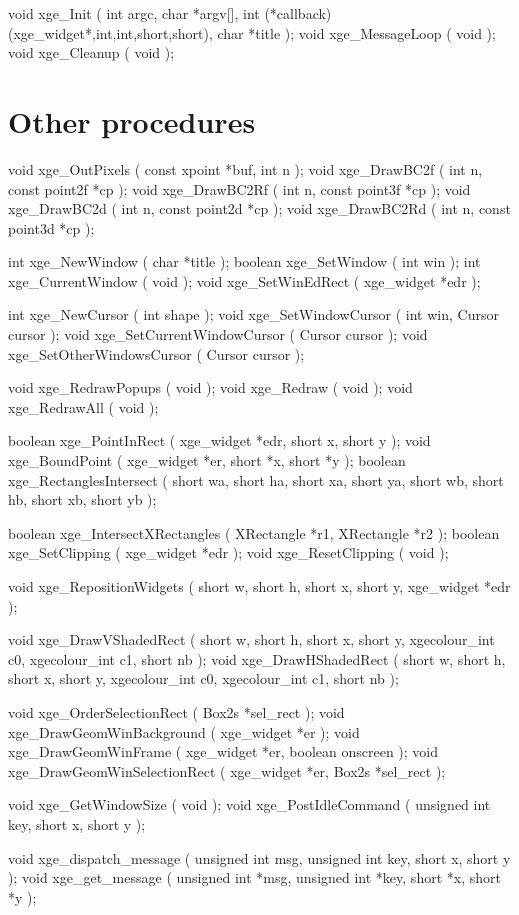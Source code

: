 \begin{listingC}
void xge_Init ( int argc, char *argv[],
                int (*callback)(xge_widget*,int,int,short,short),
                char *title );
void xge_MessageLoop ( void );
void xge_Cleanup ( void );
\end{listingC}


\section{Other procedures}

\begin{listingC}
void xge_OutPixels ( const xpoint *buf, int n );
void xge_DrawBC2f ( int n, const point2f *cp );
void xge_DrawBC2Rf ( int n, const point3f *cp );
void xge_DrawBC2d ( int n, const point2d *cp );
void xge_DrawBC2Rd ( int n, const point3d *cp );

int     xge_NewWindow ( char *title );
boolean xge_SetWindow ( int win );
int     xge_CurrentWindow ( void );
void    xge_SetWinEdRect ( xge_widget *edr );

int  xge_NewCursor ( int shape );
void xge_SetWindowCursor ( int win, Cursor cursor );
void xge_SetCurrentWindowCursor ( Cursor cursor );
void xge_SetOtherWindowsCursor ( Cursor cursor );

void xge_RedrawPopups ( void );
void xge_Redraw ( void );
void xge_RedrawAll ( void );

boolean xge_PointInRect ( xge_widget *edr, short x, short y );
void xge_BoundPoint ( xge_widget *er, short *x, short *y );
boolean xge_RectanglesIntersect (
              short wa, short ha, short xa, short ya,
              short wb, short hb, short xb, short yb );

boolean xge_IntersectXRectangles ( XRectangle *r1, XRectangle *r2 );
boolean xge_SetClipping ( xge_widget *edr );
void xge_ResetClipping ( void );

void xge_RepositionWidgets ( short w, short h, short x, short y,
                             xge_widget *edr );

void xge_DrawVShadedRect ( short w, short h, short x, short y,
                   xgecolour_int c0, xgecolour_int c1, short nb );
void xge_DrawHShadedRect ( short w, short h, short x, short y,
                   xgecolour_int c0, xgecolour_int c1, short nb );

void xge_OrderSelectionRect ( Box2s *sel_rect );
void xge_DrawGeomWinBackground ( xge_widget *er );
void xge_DrawGeomWinFrame ( xge_widget *er, boolean onscreen );
void xge_DrawGeomWinSelectionRect ( xge_widget *er,
                                    Box2s *sel_rect );

void xge_GetWindowSize ( void );
void xge_PostIdleCommand ( unsigned int key, short x, short y );

void xge_dispatch_message ( unsigned int msg, unsigned int key,
                            short x, short y );
void xge_get_message ( unsigned int *msg, unsigned int *key,
                       short *x, short *y );
\end{listingC}


